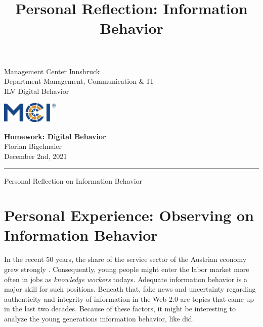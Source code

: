 \documentclass[11pt,letterpaper]{article}
\newcommand{\fontsmall}{\fontsize{7pt}{10pt}\selectfont}
\newcommand{\fontnormal}{\fontsize{11pt}{16pt}\selectfont}
\newcommand{\headline}{\fontsize{17pt}{26pt}\selectfont}
\begin{document}
   \title{Personal Reflection: Information Behavior}



\noindent\begin{minipage}{0.5\textwidth}
\fontsmall
Management Center Innsbruck \\
Department Management, Communication \& IT  \\
ILV Digital Behavior


\end{minipage}%
\hfill%
\begin{minipage}{0.3\textwidth}\raggedleft
\includegraphics[height=1.0cm]{mci-logo.png}

\end{minipage}



\begin{center}
\textbf{Homework: Digital Behavior}\\   %
Florian Bigelmaier\\                         %
December 2nd, 2021\\                         %
\end{center}
\rule{\linewidth}{0.1mm}




\headline \begin{center}
Personal Reflection on Information Behavior
\end{center}
\fontnormal

\section*{Personal Experience: Observing on Information Behavior}
In the recent 50 years, the share of the service sector of the Austrian economy grew strongly \autocite[][]{StatistikAustria.2021}. Consequently, young people might enter the labor market more often in jobs as \textit{knowledge workers} todays. Adequate information behavior is a major skill for such positions. Beneath that, fake news and uncertainty regarding authenticity and integrity of information in the Web 2.0 are topics that came up in the last two decades. Because of these factors, it might be interesting to analyze the young generations information behavior, like \cite{Nicholas.2011} did.
\end{document}
